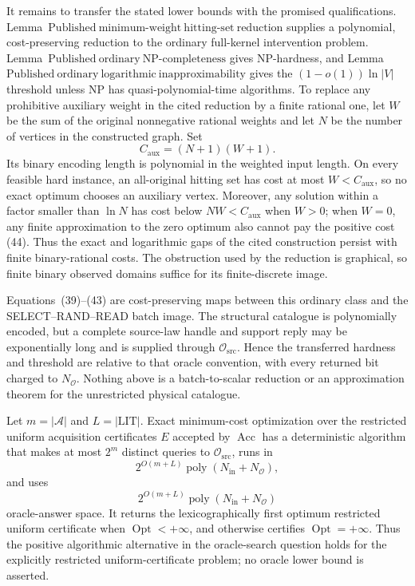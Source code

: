 It remains to transfer the stated lower bounds with the promised qualifications.  Lemma~\(\mathrm{Published\ minimum\mbox{-}weight\ hitting\mbox{-}set\ reduction}\) supplies a polynomial, cost-preserving reduction to the ordinary full-kernel intervention problem.  Lemma~\(\mathrm{Published\ ordinary\ NP\mbox{-}completeness}\) gives NP-hardness, and Lemma~\(\mathrm{Published\ ordinary\ logarithmic\ inapproximability}\) gives the \((1-o(1))\ln|V|\) threshold unless \(\mathrm{NP}\) has quasi-polynomial-time algorithms.  To replace any prohibitive auxiliary weight in the cited reduction by a finite rational one, let \(W\) be the sum of the original nonnegative rational weights and let \(N\) be the number of vertices in the constructed graph.  Set
\[
 C_{\mathrm{aux}}=(N+1)(W+1).
 \tag{44}
\]
Its binary encoding length is polynomial in the weighted input length.  On every feasible hard instance, an all-original hitting set has cost at most \(W<C_{\mathrm{aux}}\), so no exact optimum chooses an auxiliary vertex.  Moreover, any solution within a factor smaller than \(\ln N\) has cost below \(NW<C_{\mathrm{aux}}\) when \(W>0\); when \(W=0\), any finite approximation to the zero optimum also cannot pay the positive cost (44).  Thus the exact and logarithmic gaps of the cited construction persist with finite binary-rational costs.  The obstruction used by the reduction is graphical, so finite binary observed domains suffice for its finite-discrete image.

Equations~(39)--(43) are cost-preserving maps between this ordinary class and the SELECT--RAND--READ batch image.  The structural catalogue is polynomially encoded, but a complete source-law handle and support reply may be exponentially long and is supplied through \(\mathcal O_{\mathrm{src}}\).  Hence the transferred hardness and threshold are relative to that oracle convention, with every returned bit charged to \(N_{\mathcal O}\).  Nothing above is a batch-to-scalar reduction or an approximation theorem for the unrestricted physical catalogue.

Let \(m=|\mathcal A|\) and \(L=|\mathrm{LIT}|\).  Exact minimum-cost optimization over the restricted uniform acquisition certificates \(E\) accepted by \(\operatorname{Acc}\) has a deterministic algorithm that makes at most \(2^m\) distinct queries to \(\mathcal O_{\mathrm{src}}\), runs in
\[
 2^{O(m+L)}\operatorname{poly}(N_{\mathrm{in}}+N_{\mathcal O}),
\]
and uses
\[
 2^{O(m+L)}\operatorname{poly}(N_{\mathrm{in}}+N_{\mathcal O})
\]
oracle-answer space.  It returns the lexicographically first optimum restricted uniform certificate when \(\operatorname{Opt}<+\infty\), and otherwise certifies \(\operatorname{Opt}=+\infty\).  Thus the positive algorithmic alternative in the oracle-search question holds for the explicitly restricted uniform-certificate problem; no oracle lower bound is asserted.

